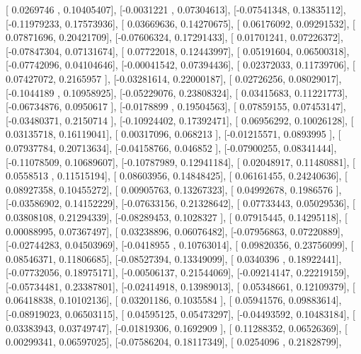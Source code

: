 \documentclass{article}
\begin{document}
       [ 0.0269746 ,  0.10405407],
       [-0.0031221 ,  0.07304613],
       [-0.07541348,  0.13835112],
       [-0.11979233,  0.17573936],
       [ 0.03669636,  0.14270675],
       [ 0.06176092,  0.09291532],
       [ 0.07871696,  0.20421709],
       [-0.07606324,  0.17291433],
       [ 0.01701241,  0.07226372],
       [-0.07847304,  0.07131674],
       [ 0.07722018,  0.12443997],
       [ 0.05191604,  0.06500318],
       [-0.07742096,  0.04104646],
       [-0.00041542,  0.07394436],
       [ 0.02372033,  0.11739706],
       [ 0.07427072,  0.2165957 ],
       [-0.03281614,  0.22000187],
       [ 0.02726256,  0.08029017],
       [-0.1044189 ,  0.10958925],
       [-0.05229076,  0.23808324],
       [ 0.03415683,  0.11221773],
       [-0.06734876,  0.0950617 ],
       [-0.0178899 ,  0.19504563],
       [ 0.07859155,  0.07453147],
       [-0.03480371,  0.2150714 ],
       [-0.10924402,  0.17392471],
       [ 0.06956292,  0.10026128],
       [ 0.03135718,  0.16119041],
       [ 0.00317096,  0.068213  ],
       [-0.01215571,  0.0893995 ],
       [ 0.07937784,  0.20713634],
       [-0.04158766,  0.046852  ],
       [-0.07900255,  0.08341444],
       [-0.11078509,  0.10689607],
       [-0.10787989,  0.12941184],
       [ 0.02048917,  0.11480881],
       [ 0.0558513 ,  0.11515194],
       [ 0.08603956,  0.14848425],
       [ 0.06161455,  0.24240636],
       [ 0.08927358,  0.10455272],
       [ 0.00905763,  0.13267323],
       [ 0.04992678,  0.1986576 ],
       [-0.03586902,  0.14152229],
       [-0.07633156,  0.21328642],
       [ 0.07733443,  0.05029536],
       [ 0.03808108,  0.21294339],
       [-0.08289453,  0.1028327 ],
       [ 0.07915445,  0.14295118],
       [ 0.00088995,  0.07367497],
       [ 0.03238896,  0.06076482],
       [-0.07956863,  0.07220889],
       [-0.02744283,  0.04503969],
       [-0.0418955 ,  0.10763014],
       [ 0.09820356,  0.23756099],
       [ 0.08546371,  0.11806685],
       [-0.08527394,  0.13349099],
       [ 0.0340396 ,  0.18922441],
       [-0.07732056,  0.18975171],
       [-0.00506137,  0.21544069],
       [-0.09214147,  0.22219159],
       [-0.05734481,  0.23387801],
       [-0.02414918,  0.13989013],
       [ 0.05348661,  0.12109379],
       [ 0.06418838,  0.10102136],
       [ 0.03201186,  0.1035584 ],
       [ 0.05941576,  0.09883614],
       [-0.08919023,  0.06503115],
       [ 0.04595125,  0.05473297],
       [-0.04493592,  0.10483184],
       [ 0.03383943,  0.03749747],
       [-0.01819306,  0.1692909 ],
       [ 0.11288352,  0.06526369],
       [ 0.00299341,  0.06597025],
       [-0.07586204,  0.18117349],
       [ 0.0254096 ,  0.21828799],
\end{document}
